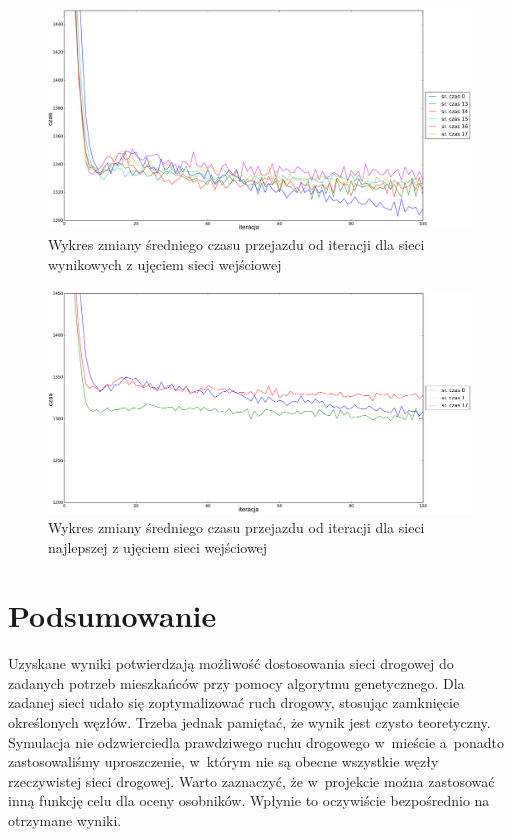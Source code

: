 \documentclass[twoside,12pt]{report}
\let\oldsection\chapter
\def\chapter{\cleardoublepage\oldsection}
\begin{document}
\begin{figure}[ht]
\centering
\includegraphics[width=1\textwidth]{img/iters/iters4}
\caption{Wykres zmiany średniego czasu przejazdu od iteracji dla sieci wynikowych z ujęciem sieci wejściowej}
\label{iters4}
\end{figure}

\begin{figure}[ht]
\centering
\includegraphics[width=1\textwidth]{img/iters/iters5}
\caption{Wykres zmiany średniego czasu przejazdu od iteracji dla sieci najlepszej z ujęciem sieci wejściowej}
\label{iters5}
\end{figure}

\chapter{Podsumowanie}\label{rozdz.podsumowanie} 
Uzyskane wyniki potwierdzają możliwość dostosowania sieci drogowej do zadanych potrzeb mieszkańców przy pomocy algorytmu genetycznego. Dla zadanej sieci udało się zoptymalizować ruch drogowy, stosując zamknięcie określonych węzłów. Trzeba jednak pamiętać, że wynik jest czysto teoretyczny. Symulacja nie odzwierciedla prawdziwego ruchu drogowego w~mieście a~ponadto zastosowaliśmy uproszczenie, w~którym nie są obecne wszystkie węzły rzeczywistej sieci drogowej. Warto zaznaczyć, że w~projekcie można zastosować inną funkcję celu dla oceny osobników. Wpłynie to oczywiście bezpośrednio na otrzymane wyniki.
\end{document}
